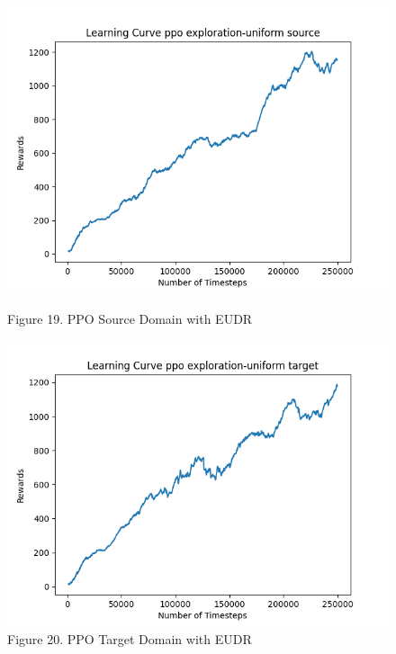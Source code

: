 \documentclass[12pt]{article}
\begin{document}
\begin{figure}[H]
    \vfill
    \begin{minipage}{0.45\textwidth}
        \centering
        \includegraphics[width=\textwidth]{../images/Learning_Curve_PPO_EU_Source.png}
        \caption{Figure 19. PPO Source Domain with EUDR}
        \label{fig:ppo_source_eudr}
    \end{minipage}
    \hfill
    \begin{minipage}{0.45\textwidth}
        \centering
        \includegraphics[width=\textwidth]{../images/Learning_Curve_PPO_EU_Target.png}
        \caption{Figure 20. PPO Target Domain with EUDR}
        \label{fig:ppo_target_eudr}
    \end{minipage}
\end{figure}
\end{document}
